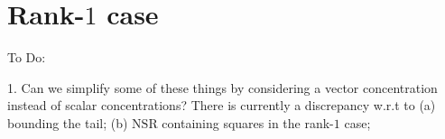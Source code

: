 \documentclass[10pt]{article}
\newcommand{\by}{\bm{y}}
\newcommand{\bq}{\bm{q}}
\newcommand{\bs}{\bm{s}}
\newcommand{\nsrmax}{\text{NSR}}
\begin{document}
\newcommand{\Y}{\bm{Y}}
\newcommand{\z}{\bm{z}}
%

\newcommand{\E}{\mathbb{E}}
\section{Rank-$1$ case}

{\color{red} 
To Do:

1. Can we simplify some of these things by considering a vector concentration instead of scalar concentrations? There is currently a discrepancy w.r.t to (a) bounding the tail; (b) $\nsrmax$ containing squares in the rank-$1$ case;

}
\end{document}
